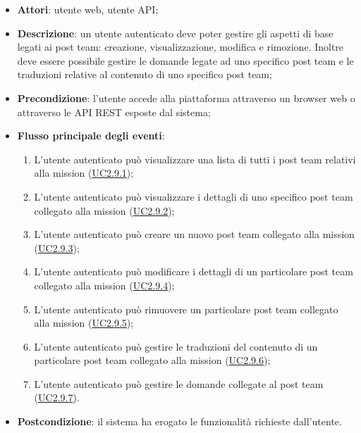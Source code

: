 \begin{itemize}
\item \textbf{Attori}: utente web, utente API;
\item \textbf{Descrizione}: un utente autenticato deve poter gestire gli aspetti di base legati ai post team: creazione, visualizzazione, modifica e rimozione. Inoltre deve essere possibile gestire le domande legate ad uno specifico post team e le traduzioni relative al contenuto di uno specifico post team; 
      \item \textbf{Precondizione}: l'utente accede alla piattaforma attraverso un browser web o attraverso le API REST esposte dal sistema;

        \item \textbf{Flusso principale degli eventi}:
          \begin{enumerate}
          \item L'utente autenticato può visualizzare una lista di tutti i post team relativi alla mission (\hyperlink{UC2.9.1}{UC2.9.1});
          \item L'utente autenticato può visualizzare i dettagli di uno specifico post team collegato alla mission (\hyperlink{UC2.9.2}{UC2.9.2});
          \item L'utente autenticato può creare un nuovo post team collegato alla mission (\hyperlink{UC2.9.3}{UC2.9.3});
          \item L'utente autenticato può modificare i dettagli di un particolare post team collegato alla mission (\hyperlink{UC2.9.4}{UC2.9.4});
          \item L'utente autenticato può rimuovere un particolare post team collegato alla mission (\hyperlink{UC2.9.5}{UC2.9.5});
          \item L'utente autenticato può gestire le traduzioni del contenuto di un particolare post team collegato alla mission (\hyperlink{UC2.9.6}{UC2.9.6});
          \item L'utente autenticato può gestire le domande collegate al post team (\hyperlink{UC2.9.7}{UC2.9.7}).

      \end{enumerate}
    \item \textbf{Postcondizione}: il sistema ha erogato le funzionalità richieste dall'utente.
  \end{itemize}
\hypertarget{UC2.9.1}{}

